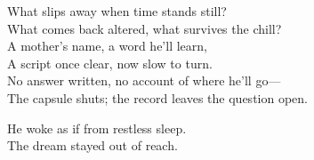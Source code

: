 \begin{lyrics}
What slips away when time stands still?\\
What comes back altered, what survives the chill?\\
A mother’s name, a word he’ll learn,\\
A script once clear, now slow to turn.\\
No answer written, no account of where he’ll go—\\
The capsule shuts; the record leaves the question open.

He woke as if from restless sleep.\\
The dream stayed out of reach.
\end{lyrics}

